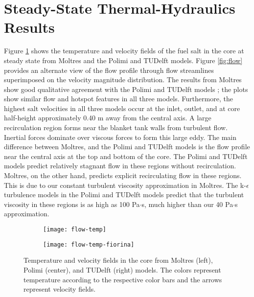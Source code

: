 \section{Steady-State Thermal-Hydraulics Results} \label{sec:ss-th}

Figure \ref{fig:flow-temp} shows the temperature and velocity fields of the
fuel salt in the core at steady state from Moltres and the Polimi and TUDelft
models. Figure \ref{fig:flow} provides an alternate view of the flow profile
through flow streamlines superimposed on the velocity magnitude distribution.
The results from Moltres show good qualitative agreement with the Polimi and
TUDelft models \cite{fiorina_modelling_2014}; the plots show similar
flow and hotspot features in all three models. Furthermore, the highest salt
velocities in all three models occur at the inlet, outlet, and at core
half-height approximately 0.40 m away from the central axis. A large
recirculation region forms near the blanket tank walls from turbulent flow.
Inertial forces dominate over viscous forces to form this large eddy. The main
difference between Moltres, and the Polimi and TUDelft models is the flow
profile near the central axis at the top and bottom of the core.
The Polimi and TUDelft models predict relatively stagnant flow in these
regions without recirculation. Moltres, on the other hand, predicts explicit
recirculating flow in these regions. This is due to our constant turbulent
viscosity approximation in Moltres. The k-$\epsilon$ turbulence models in the
Polimi and TUDelft models predict that the turbulent viscosity in these
regions is as high as 100 Pa$\cdot$s, much higher than our 40 Pa$\cdot$s
approximation.

\begin{figure}[htbp!]
    \centering
    \begin{subfigure}[t]{.365\textwidth}
        \centering
        \texttt{[image: flow-temp]}
    \end{subfigure}
    \hfill
    \begin{subfigure}[t]{.625\textwidth}
        \centering
        \texttt{[image: flow-temp-fiorina]}
    \end{subfigure}
    \caption{Temperature and velocity fields in the core from Moltres
    (left), Polimi (center), and TUDelft (right) models. The colors represent
    temperature according to the respective color bars and the arrows
    represent velocity fields.}
    \label{fig:flow-temp}
\end{figure}


